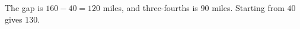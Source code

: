 The gap is $160-40=120$ miles, and three-fourths is $90$ miles. Starting from $40$ gives $\boxed{130}$.
